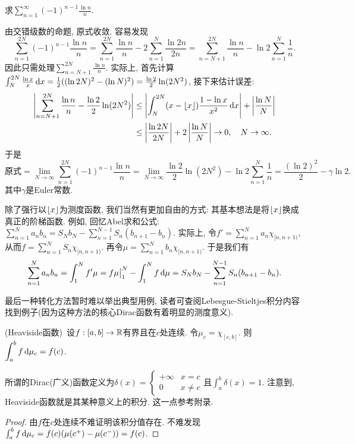 \begin{example}
	求$\displaystyle \sum_{n=1}^{\infty} (-1)^{n-1} \frac{\ln n}{n}$. 
\end{example}
\begin{solution}
	由交错级数的命题, 原式收敛. 容易发现$$\sum_{n=1}^{2N} (-1)^{n-1} \frac{\ln n}{n} = \sum_{n=1}^{2N} \frac{\ln n}{n} - 2\sum_{n=1}^{N} \frac{\ln 2n}{2n} = \sum_{n=N+1}^{2N} \frac{\ln n}{n} - \ln 2 \sum_{n=1}^{N} \frac{1}{n} .$$
	因此只需处理$\sum_{n=N+1}^{2N} \frac{\ln n}{n}$. 实际上, 首先计算$\int_N^{2N} \frac{\ln x}{x} \mathop{}\!\mathrm{d} x = \frac{1}{2}((\ln 2N)^2-(\ln N)^2) = \frac{\ln 2}{2}\ln (2N^2) $, 接下来估计误差: 
	\begin{align*}
		\left| \sum_{n=N+1}^{2N} \frac{\ln n}{n} - \frac{\ln 2}{2}\ln (2N^2) \right| &\leq \left| \int_{N}^{2N} (x-\lfloor x \rfloor) \frac{1-\ln x}{x^2} \mathop{}\!\mathrm{d} x \right| + \left| \frac{\ln N}{N} \right| \\
		&\leq \left| \frac{\ln 2N}{2N} \right| + 2\left| \frac{\ln N}{N} \right| \to 0,\quad N \to \infty .
	\end{align*}
	于是$$\textit{原式} = \lim_{N \to \infty} \sum_{n=1}^{2N} (-1)^{n-1} \frac{\ln n}{n} = \lim_{N \to \infty} \frac{\ln 2}{2}\ln (2N^2) - \ln 2\sum_{n=1}^{N} \frac{1}{n} = \frac{(\ln 2)^2}{2} - \gamma \ln 2.$$
	其中$\gamma$是Euler常数. 
\end{solution}

除了强行以$\lfloor x \rfloor$为测度函数, 我们当然有更加自由的方式: 其基本想法是将$\lfloor x \rfloor$换成真正的阶梯函数. 例如, 回忆Abel求和公式: $\sum_{n=1}^{N} a_nb_n = S_Nb_N - \sum_{n=1}^{N-1} S_n(b_{n+1}-b_n)$. 实际上, 令$f' = \sum_{n=1}^{N} a_n \chi_{[n,n+1 )}$, 从而$f = \sum_{n=1}^{N} S_n\chi_{[n,n+1 )}$. 再令$\mu = \sum_{n=1}^{N} b_n \chi_{[n,n+1 )}$. 于是我们有$$\sum_{n=1}^{N} a_nb_n = \int_1^N f' \mu = f\mu \big|_1^N - \int_1^N f \mathop{}\!\mathrm{d} \mu = S_Nb_N - \sum_{n=1}^{N-1} S_n(b_{n+1}-b_n). $$

最后一种转化方法暂时难以举出典型用例, 读者可查阅Lebesgue-Stieltjes积分内容找到例子(因为这种方法的核心Dirac函数有着明显的测度意义). 

\begin{example}
	(Heaviside函数)~设$f:[a,b] \to \mathbb{R}$有界且在$c$处连续. 令$\mu _c=\chi _{[c,b]}$. 则$\displaystyle \int_a^b f \mathop{}\!\mathrm{d} \mu _c = f(c)$. 
\end{example}
\begin{remark}
	所谓的Dirac(广义)函数定义为$\delta (x) = \begin{cases}
		+\infty & x=c \\ 0 & x \neq c
	\end{cases}$且$\int_a^b \delta (x) =1$. 注意到, Heaviside函数就是其某种意义上的积分. 这一点参考附录. 
\end{remark}
\begin{proof}
	由$f$在$c$处连续不难证明该积分值存在. 不难发现$\int_a^b f \mathop{}\!\mathrm{d} \mu _c = f(c)(\mu (c^+)- \mu (c^-)) = f(c)$. 
\end{proof}






